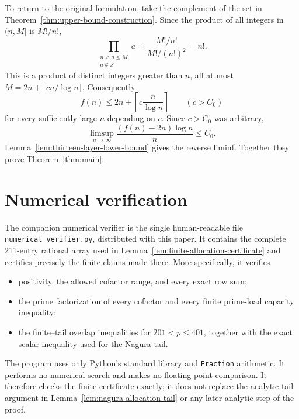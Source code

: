 \documentclass[11pt]{article}
\numberwithin{equation}{section}
\theoremstyle{definition}
\theoremstyle{remark}
\newcommand{\1}{\mathbf 1}
\begin{document}
To return to the original formulation, take the complement of the set in
Theorem~\ref{thm:upper-bound-construction}.  Since the
product of all integers in \((n,M]\) is \(M!/n!\),
\begin{equation}
 \prod_{\substack{n<a\le M\\a\notin\mathcal S}}a
   =\frac{M!/n!}{M!/(n!)^2}=n!.
 \label{eq:final-factorial-product}
\end{equation}
This is a product of distinct integers greater than \(n\), all at most
\(M=2n+\lceil cn/\log n\rceil\).  Consequently
\begin{equation}
 f(n)\le2n+\left\lceil c\frac n{\log n}\right\rceil
 \qquad(c>C_0)
 \label{eq:final-upper-bound}
\end{equation}
for every sufficiently large \(n\) depending on \(c\).  Since \(c>C_0\)
was arbitrary,
\begin{equation}
 \limsup_{n\to\infty}
 \frac{(f(n)-2n)\log n}{n}\le C_0.
 \label{eq:final-limsup}
\end{equation}
Lemma~\ref{lem:thirteen-layer-lower-bound} gives the reverse liminf.
Together they prove Theorem~\ref{thm:main}.
 \appendix
\section{Numerical verification}
\label{app:numerical-verification}

The companion numerical verifier is the single human-readable file
\texttt{numerical\_verifier.py}, distributed with this paper.  It contains
the complete 211-entry rational array used in
Lemma~\ref{lem:finite-allocation-certificate} and certifies precisely the
finite claims made there.  More specifically, it verifies
\begin{itemize}
 \item positivity, the allowed cofactor range, and every exact row sum;
 \item the prime factorization of every cofactor and every finite prime-load
       capacity inequality;
 \item the finite--tail overlap inequalities for \(201<p\le401\), together
       with the exact scalar inequality used for the Nagura tail.
\end{itemize}
The program uses only Python's standard library and \texttt{Fraction}
arithmetic.  It performs no numerical search and makes no floating-point
comparison.  It therefore checks the finite certificate exactly; it does
not replace the analytic tail argument in
Lemma~\ref{lem:nagura-allocation-tail} or any later analytic step of the
proof.
 
\end{document}
